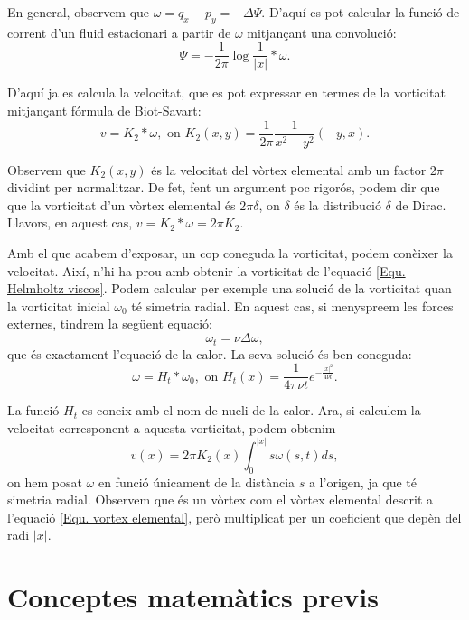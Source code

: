 \documentclass{article}
\numberwithin{equation}{section}
\begin{document}
En general, observem que $\omega=q_x-p_y=-\Delta\Psi$. D'aqu\'{i} es pot calcular la funci\'{o} de corrent d'un fluid estacionari a partir de $\omega$ mitjan\c{c}ant una convoluci\'{o}:
\[\Psi=-\frac{1}{2\pi}\log\frac{1}{|x|}*\omega.\]

D'aqu\'{i} ja es calcula la velocitat, que es pot expressar en termes de la vorticitat mitjan\c{c}ant f\'{o}rmula de Biot-Savart:
\begin{equation}
v=K_2*\omega,\text{ on }K_2(x,y)=\frac{1}{2\pi}\frac{1}{x^2+y^2}(-y,x).
\end{equation}

Observem que $K_2(x,y)$ \'{e}s la velocitat del v\`{o}rtex elemental amb un factor $2\pi$ dividint per normalitzar. De fet, fent un argument poc rigor\'{o}s, podem dir que que la vorticitat d'un v\`{o}rtex elemental \'{e}s $2\pi\delta$, on $\delta$ \'{e}s la distribuci\'{o} $\delta$ de Dirac. Llavors, en aquest cas, $v=K_2*\omega=2\pi K_2$.

Amb el que acabem d'exposar, un cop coneguda la vorticitat, podem con\`{e}ixer la velocitat. Aix\'{i}, n'hi ha prou amb obtenir la vorticitat de l'equaci\'{o} \eqref{Equ. Helmholtz viscos}. Podem calcular per exemple una soluci\'{o} de la vorticitat quan la vorticitat inicial $\omega_0$ t\'{e} simetria radial. En aquest cas, si menyspreem les forces externes, tindrem la seg\"{u}ent equaci\'{o}:
\[\omega_t=\nu\Delta\omega,\]
que \'{e}s exactament l'equaci\'{o} de la calor. La seva soluci\'{o} \'{e}s ben coneguda:
\begin{equation}\label{Equ. calor}
\omega=H_t*\omega_0,\text{ on }H_t(x)=\frac{1}{4\pi\nu t}e^{-\frac{|x|^2}{4\nu t}}.
\end{equation}

La funci\'{o} $H_t$ es coneix amb el nom de nucli de la calor. Ara, si calculem la velocitat corresponent a aquesta vorticitat, podem obtenim
\begin{equation}\label{Equ. Biot-Savart temporal}
v(x)=2\pi K_2(x)\int_0^{|x|}s\omega(s,t)ds,
\end{equation}
on hem posat $\omega$ en funci\'{o} \'{u}nicament de la dist\`{a}ncia $s$ a l'origen, ja que t\'{e} simetria radial. Observem que \'{e}s un v\`{o}rtex com el v\`{o}rtex elemental descrit a l'equaci\'{o} \eqref{Equ. vortex elemental}, per\`{o} multiplicat per un coeficient que dep\`{e}n del radi $|x|$.

\section{Conceptes matem\`{a}tics previs}
\end{document}
